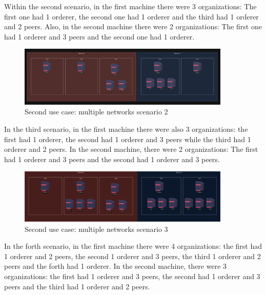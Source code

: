 Within the second scenario, in the first machine there were 3 organizations: The first one had 1 orderer, the second one had 1 orderer and the third had 1 orderer and 2 peers. Also, in the second machine there were 2 organizations: The first one had 1 orderer and 3 peers and the second one had 1 orderer.

\begin{figure}[H]
    \centering
    \includegraphics[width=0.9\textwidth]{assets/use-case-2/scenario2.png} %
    \caption{Second use case: multiple networks scenario 2}
    \label{fig:sample-image} 
\end{figure}

In the third scenario, in the first machine there were also 3 organizations: the first had 1 orderer, the second had 1 orderer and 3 peers while the third had 1 orderer and 2 peers. In the second machine, there were 2 organizations: The first had 1 orderer and 3 peers and the second had 1 orderer and 3 peers.

\begin{figure}[H]
    \centering
    \includegraphics[width=0.9\textwidth]{assets/use-case-2/scenario3.png} %
    \caption{Second use case: multiple networks scenario 3}
    \label{fig:sample-image} 
\end{figure}

In the forth scenario, in the first machine there were 4 organizations: the first had 1 orderer and 2 peers, the second 1 orderer and 3 peers, the third 1 orderer and 2 peers and the forth had 1 orderer. In the second machine, there were 3 organizations: the first had 1 orderer and 3 peers, the second had 1 orderer and 3 peers and the third had 1 orderer and 2 peers.

